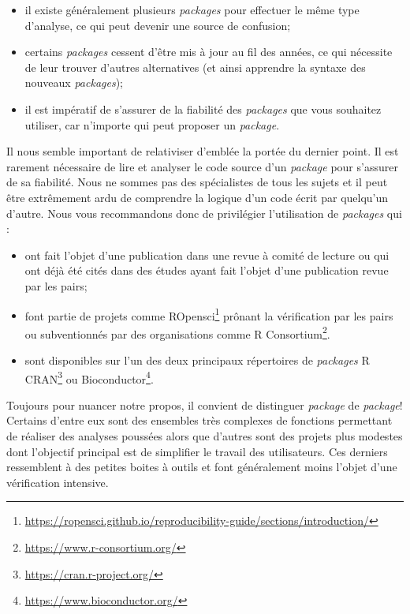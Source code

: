 \documentclass[
  11pt,
  french,
]{book}
\providecommand{\tightlist}{%
  \setlength{\itemsep}{0pt}\setlength{\parskip}{0pt}}
\renewcommand{\href}[2]{#2\footnote{\url{#1}}}
\begin{document}
\begin{itemize}
\tightlist
\item
  il existe généralement plusieurs \emph{packages} pour effectuer le même type d'analyse, ce qui peut devenir une source de confusion;
\item
  certains \emph{packages} cessent d'être mis à jour au fil des années, ce qui nécessite de leur trouver d'autres alternatives (et ainsi apprendre la syntaxe des nouveaux \emph{packages});
\item
  il est impératif de s'assurer de la fiabilité des \emph{packages} que vous souhaitez utiliser, car n'importe qui peut proposer un \emph{package}.
\end{itemize}

Il nous semble important de relativiser d'emblée la portée du dernier point. Il est rarement nécessaire de lire et analyser le code source d'un \emph{package} pour s'assurer de sa fiabilité. Nous ne sommes pas des spécialistes de tous les sujets et il peut être extrêmement ardu de comprendre la logique d'un code écrit par quelqu'un d'autre. Nous vous recommandons donc de privilégier l'utilisation de \emph{packages} qui :

\begin{itemize}
\tightlist
\item
  ont fait l'objet d'une publication dans une revue à comité de lecture ou qui ont déjà été cités dans des études ayant fait l'objet d'une publication revue par les pairs;
\item
  font partie de projets comme \href{https://ropensci.github.io/reproducibility-guide/sections/introduction/}{ROpensci} prônant la vérification par les pairs ou subventionnés par des organisations comme \href{https://www.r-consortium.org/}{R Consortium}.
\item
  sont disponibles sur l'un des deux principaux répertoires de \emph{packages} R \href{https://cran.r-project.org/}{CRAN} ou \href{https://www.bioconductor.org/}{Bioconductor}.
\end{itemize}

Toujours pour nuancer notre propos, il convient de distinguer \emph{package} de \emph{package}! Certains d'entre eux sont des ensembles très complexes de fonctions permettant de réaliser des analyses poussées alors que d'autres sont des projets plus modestes dont l'objectif principal est de simplifier le travail des utilisateurs. Ces derniers ressemblent à des petites boites à outils et font généralement moins l'objet d'une vérification intensive.
\end{document}
